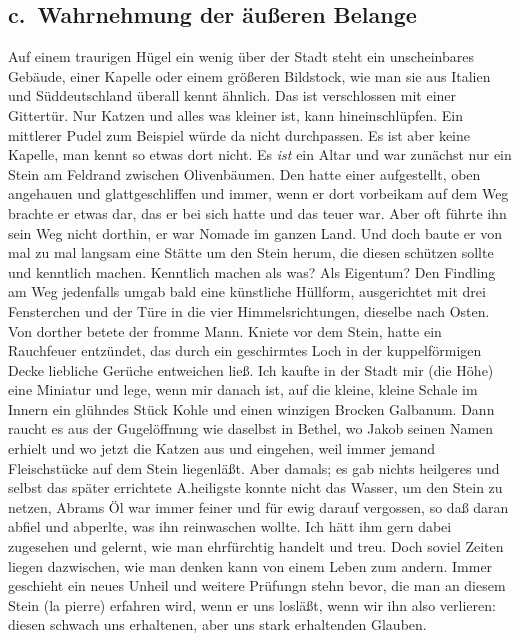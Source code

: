 \documentclass[
]{article}
\author{}
\date{\vspace{-2.5em}}
\begin{document}
\subsection{c.~Wahrnehmung der äußeren
Belange}\label{c.-wahrnehmung-der-uxe4uuxdferen-belange}

Auf einem traurigen Hügel ein wenig über der Stadt steht ein
unscheinbares Gebäude, einer Kapelle oder einem größeren Bildstock, wie
man sie aus Italien und Süddeutschland überall kennt ähnlich. Das ist
verschlossen mit einer Gittertür. Nur Katzen und alles was kleiner ist,
kann hineinschlüpfen. Ein mittlerer Pudel zum Beispiel würde da nicht
durchpassen. Es ist aber keine Kapelle, man kennt so etwas dort nicht.
Es \emph{ist} ein Altar und war zunächst nur ein Stein am Feldrand
zwischen Olivenbäumen. Den hatte einer aufgestellt, oben angehauen und
glattgeschliffen und immer, wenn er dort vorbeikam auf dem Weg brachte
er etwas dar, das er bei sich hatte und das teuer war. Aber oft führte
ihn sein Weg nicht dorthin, er war Nomade im ganzen Land. Und doch baute
er von mal zu mal langsam eine Stätte um den Stein herum, die diesen
schützen sollte und kenntlich machen. Kenntlich machen als was? Als
Eigentum? Den Findling am Weg jedenfalls umgab bald eine künstliche
Hüllform, ausgerichtet mit drei Fensterchen und der Türe in die vier
Himmelsrichtungen, dieselbe nach Osten. Von dorther betete der fromme
Mann. Kniete vor dem Stein, hatte ein Rauchfeuer entzündet, das durch
ein geschirmtes Loch in der kuppelförmigen Decke liebliche Gerüche
entweichen ließ. Ich kaufte in der Stadt mir (die Höhe) eine Miniatur
und lege, wenn mir danach ist, auf die kleine, kleine Schale im Innern
ein glühndes Stück Kohle und einen winzigen Brocken Galbanum. Dann
raucht es aus der Gugelöffnung wie daselbst in Bethel, wo Jakob seinen
Namen erhielt und wo jetzt die Katzen aus und eingehen, weil immer
jemand Fleischstücke auf dem Stein liegenläßt. Aber damals; es gab
nichts heilgeres und selbst das später errichtete A.heiligste konnte
nicht das Wasser, um den Stein zu netzen, Abrams Öl war immer feiner und
für ewig darauf vergossen, so daß daran abfiel und abperlte, was ihn
reinwaschen wollte. Ich hätt ihm gern dabei zugesehen und gelernt, wie
man ehrfürchtig handelt und treu. Doch soviel Zeiten liegen dazwischen,
wie man denken kann von einem Leben zum andern. Immer geschieht ein
neues Unheil und weitere Prüfungn stehn bevor, die man an diesem Stein
(la pierre) erfahren wird, wenn er uns losläßt, wenn wir ihn also
verlieren: diesen schwach uns erhaltenen, aber uns stark erhaltenden
Glauben.\\
\end{document}
